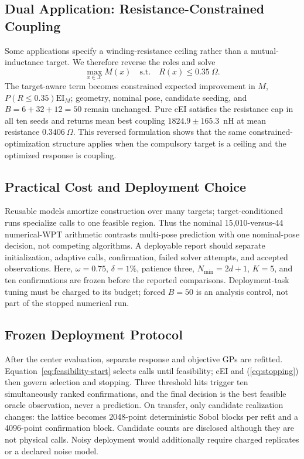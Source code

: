 \documentclass[conference]{IEEEtran}
\begin{document}
\subsection{Dual Application: Resistance-Constrained Coupling}
Some applications specify a winding-resistance ceiling rather than a mutual-inductance target. We therefore reverse the roles and solve
\begin{equation}
 \max_{x\in\mathcal X}M(x)\quad\mathrm{s.t.}\quad R(x)\leq0.35~\Omega .
\end{equation}
The target-aware term becomes constrained expected improvement in $M$, $P(R\leq0.35)\mathrm{EI}_M$; geometry, nominal pose, candidate seeding, and $B=6+32+12=50$ remain unchanged. Pure cEI satisfies the resistance cap in all ten seeds and returns mean best coupling $1824.9\pm165.3$~nH at mean resistance $0.3406~\Omega$. This reversed formulation shows that the same constrained-optimization structure applies when the compulsory target is a ceiling and the optimized response is coupling.

\subsection{Practical Cost and Deployment Choice}
Reusable models amortize construction over many targets; target-conditioned runs specialize calls to one feasible region. Thus the nominal 15,010-versus-44 numerical-WPT arithmetic contrasts multi-pose prediction with one nominal-pose decision, not competing algorithms. A deployable report should separate initialization, adaptive calls, confirmation, failed solver attempts, and accepted observations. Here, $\omega=0.75$, $\delta=1\%$, patience three, $N_{\min}=2d+1$, $K=5$, and ten confirmations are frozen before the reported comparisons. Deployment-task tuning must be charged to its budget; forced $B=50$ is an analysis control, not part of the stopped numerical run.

\subsection{Frozen Deployment Protocol}
After the center evaluation, separate response and objective GPs are refitted. Equation~\eqref{eq:feasibility-start} selects calls until feasibility; cEI and (\ref{eq:stopping}) then govern selection and stopping. Three threshold hits trigger ten simultaneously ranked confirmations, and the final decision is the best feasible oracle observation, never a prediction. On transfer, only candidate realization changes: the lattice becomes 2048-point deterministic Sobol blocks per refit and a 4096-point confirmation block. Candidate counts are disclosed although they are not physical calls. Noisy deployment would additionally require charged replicates or a declared noise model.
\end{document}
